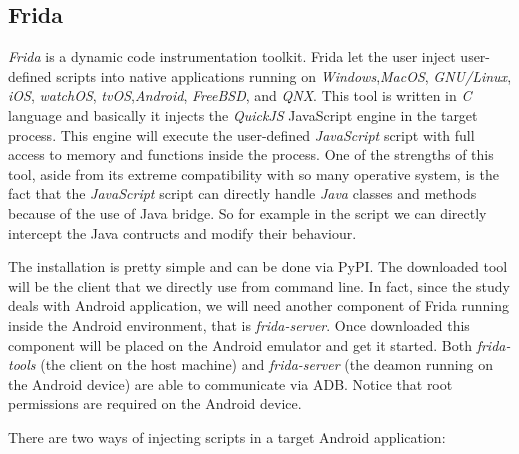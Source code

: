 		\subsection{Frida}
			\par \textit{Frida} is a dynamic code instrumentation toolkit. Frida let the user inject user-defined scripts into native applications running on \textit{Windows},\textit{MacOS}, \textit{GNU/Linux}, \textit{iOS}, \textit{watchOS}, \textit{tvOS},\textit{Android}, \textit{FreeBSD}, and \textit{QNX}. This tool is written in \textit{C} language and basically it injects the \textit{QuickJS} JavaScript engine in the target process. This engine will execute the user-defined \textit{JavaScript} script with full access to memory and functions inside the process. One of the strengths of this tool, aside from its extreme compatibility with so many operative system, is the fact that the \textit{JavaScript} script can directly handle \textit{Java} classes and methods because of the use of Java bridge. So for example in the script we can directly intercept the Java contructs and modify their behaviour. 
			\par The installation is pretty simple and can be done via PyPI. The downloaded tool will be the client that we directly use from command line. In fact, since the study deals with Android application, we will need another component of Frida running inside the Android environment, that is \textit{frida-server}. Once downloaded this component will be placed on the Android emulator and get it started. Both \textit{frida-tools} (the client on the host machine) and \textit{frida-server} (the deamon running on the Android device) are able to communicate via ADB. Notice that root permissions are required on the Android device.
			\par There are two ways of injecting scripts in a target Android application:
